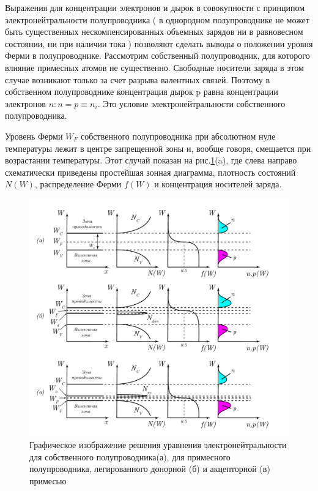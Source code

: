 Выражения для концентрации электронов и дырок в совокупности с принципом электронейтральности
полупроводника ( в однородном полупроводнике не может быть существенных нескомпенсированных объемных зарядов ни в
равновесном состоянии, ни при наличии тока ) позволяют сделать выводы о положении уровня Ферми в полупроводнике.
Рассмотрим собственный полупроводник, для которого влияние примесных атомов не существенно. Свободные носители заряда в
этом случае возникают только за счет разрыва валентных связей. Поэтому в собственном полупроводнике концентрация дырок p
равна концентрации электронов $ n: n = p \equiv n_i$. Это условие электронейтральности собственного полупроводника.

Уровень Ферми $W_F$ собственного полупроводника при абсолютном нуле температуры лежит в центре запрещенной зоны и,
вообще говоря, смещается при возрастании температуры. Этот случай показан на рис.\ref{fig:2.1}(a), где слева направо схематически
приведены простейшая зонная диаграмма, плотность состояний $N(W)$, распределение Ферми $f (W)$ и концентрация носителей
заряда.

\begin{figure}[h!]
	\includegraphics[width = \linewidth]{img/22}
	\caption{Графическое изображение решения уравнения электронейтральности для собственного полупроводника(а), для примесного полупроводника, легированного донорной (б) и акцепторной (в) примесью}
	\label{fig:2.1}
\end{figure}


